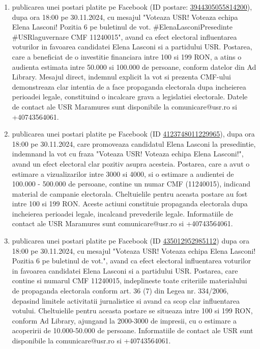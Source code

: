 \documentclass[a4paper,12pt]{article}
\begin{document}
\begin{enumerate}[leftmargin=*, label=\arabic*.)]
    \item publicarea unei postari platite pe Facebook (ID postare: \href{https://www.facebook.com/ads/library/?id=3944305055814200}{3944305055814200}), dupa ora 18:00 pe 30.11.2024, cu mesajul "Voteaza USR! Voteaza echipa Elena Lasconi! Pozitia 6 pe buletinul de vot. \#ElenaLasconiPresedinte \#USRlaguvernare CMF 11240015",  avand ca efect electoral influentarea voturilor in favoarea candidatei Elena Lasconi si a partidului USR.  Postarea, care a beneficiat de o investitie financiara intre 100 si 199 RON, a atins o audienta estimata intre 50.000 si 100.000 de persoane, conform datelor din Ad Library.  Mesajul direct, indemnul explicit la vot si prezenta CMF-ului demonstreaza clar intentia de a face propaganda electorala dupa incheierea perioadei legale, constituind o incalcare grava a legislatiei electorale.  Datele de contact ale USR Maramures sunt disponibile la comunicare@usr.ro si +40743564061.
    \item publicarea unei postari platite pe Facebook (ID \href{https://www.facebook.com/ads/library/?id=4123748011229965}{4123748011229965}), dupa ora 18:00 pe 30.11.2024, care promoveaza candidatul Elena Lasconi la presedintie, indemnand la vot cu fraza "Voteaza USR! Voteaza echipa Elena Lasconi!",  avand un efect electoral clar pozitiv asupra acesteia. Postarea, care a avut o estimare a vizualizarilor intre 3000 si 4000,  si o estimare a audientei de 100.000 - 500.000 de persoane,  contine un numar CMF (11240015), indicand material de campanie electorala.  Cheltuielile pentru aceasta postare au fost intre 100 si 199 RON.  Aceste actiuni constituie propaganda electorala dupa incheierea perioadei legale, incalcand prevederile legale.  Informatiile de contact ale USR Maramures sunt comunicare@usr.ro si +40743564061.
    \item publicarea unei postari platite pe Facebook (ID \href{https://www.facebook.com/ads/library/?id=435012952985112}{435012952985112}) dupa ora 18:00 pe 30.11.2024, cu mesajul "Voteaza USR! Voteaza echipa Elena Lasconi! Pozitia 6 pe buletinul de vot.",  avand ca efect electoral influentarea voturilor in favoarea candidatei Elena Lasconi si a partidului USR.  Postarea, care contine si numarul CMF 11240015, indeplineste toate criteriile materialului de propaganda electorala conform art. 36 (7) din Legea nr. 334/2006, depasind limitele activitatii jurnalistice si avand ca scop clar influentarea votului.  Cheltuielile pentru aceasta postare se situeaza intre 100 si 199 RON, conform Ad Library, ajungand la 2000-3000 de impresii, cu o estimare a acoperirii de 10.000-50.000 de persoane.  Informatiile de contact ale USR sunt disponibile la comunicare@usr.ro si +40743564061.

\end{enumerate}
\end{document}
